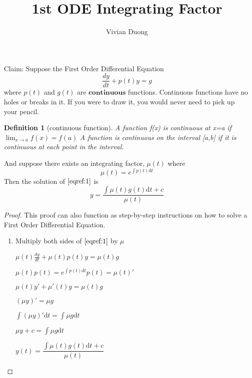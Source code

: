 \documentclass{article}
\title{1st ODE Integrating Factor}
\author{Vivian Duong}
\newtheorem{definition}{Definition}
\begin{document}
\maketitle

Claim: Suppose the First Order Differential Equation
\begin{equation} \label{eqref:1}
\frac{dy}{dt} + p(t)y = g
\end{equation}
where $p(t)$ and $g(t)$ are $\textbf{continuous}$ functions. Continuous functions have no holes or breaks in it. If you were to draw it, you would never need to pick up your pencil.

\begin{definition} [continuous function]
A function f(x) is continuous at x=a if
$\lim_{x\rightarrow a} f(x) = f(a)$
A function is continuous on the interval [a,b] if it is continuous at each point in the interval.
\end{definition}

And suppose there exists an integrating factor, $\mu(t)$ where
\begin{equation}
\mu(t) = e^{\int p(t)\mathrm{d}t} 
\end{equation}
Then the solution of $\eqref{eqref:1}$ is
\begin{equation}
y = \frac{\int \mu(t)g(t)\mathrm{d}t + c }{\mu(t)}
\end{equation}

\begin{proof}
This proof can also function as step-by-step instructions on how to solve a First Order Differential Equation.

\begin{enumerate}
\item Multiply both sides of $\ref{eqref:1}$ by $\mu$

$\mu(t)\frac{dy}{dt} + \mu(t)p(t)y = \mu(t)g$

$\mu(t)p(t) = e^{\int p(t)\mathrm{d}t}p(t)
 = \mu(t)'$

$\mu(t)y' + \mu'(t)y = \mu(t)g$

$(\mu y)' = \mu g$

$\int(\mu y)' \mathrm{d}t = \int\mu g \mathrm{d}t$

$\mu y + c = \int\mu g \mathrm{d}t$

$y(t) =\dfrac{\int\mu(t) g(t) \mathrm{d}t + c}{\mu(t)}$

\end{enumerate}
\end{proof}
\end{document}
